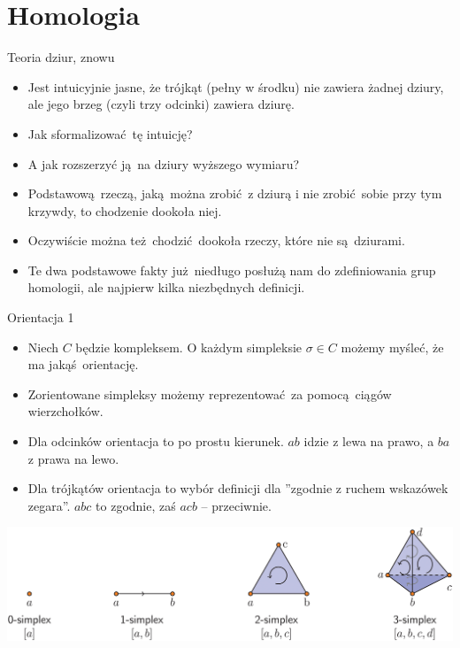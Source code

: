 \documentclass{beamer}
\begin{document}
\section{Homologia}

\begin{frame}{Teoria dziur, znowu}
\begin{itemize}
	\item Jest intuicyjnie jasne, że trójkąt (pełny w środku) nie zawiera żadnej dziury, ale jego brzeg (czyli trzy odcinki) zawiera dziurę.
	\item Jak sformalizować tę intuicję?
	\item A jak rozszerzyć ją na dziury wyższego wymiaru?
	\item Podstawową rzeczą, jaką można zrobić z dziurą i nie zrobić sobie przy tym krzywdy, to chodzenie dookoła niej.
	\item Oczywiście można też chodzić dookoła rzeczy, które nie są dziurami.
	\item Te dwa podstawowe fakty już niedługo posłużą nam do zdefiniowania grup homologii, ale najpierw kilka niezbędnych definicji.
\end{itemize}
\end{frame}

\begin{frame}{Orientacja 1}

\begin{itemize}
	\item Niech $C$ będzie kompleksem. O każdym simpleksie $\sigma \in C$ możemy myśleć, że ma jakąś orientację.
	\item Zorientowane simpleksy możemy reprezentować za pomocą ciągów wierzchołków.
	\item Dla odcinków orientacja to po prostu kierunek. $ab$ idzie z lewa na prawo, a $ba$ z prawa na lewo.
	\item Dla trójkątów orientacja to wybór definicji dla ''zgodnie z ruchem wskazówek zegara''. $abc$ to zgodnie, zaś $acb$ -- przeciwnie.
\end{itemize}

\begin{center}
	\includegraphics[scale = 0.65]{Orientacja.png}
\end{center}

\end{frame}
\end{document}
